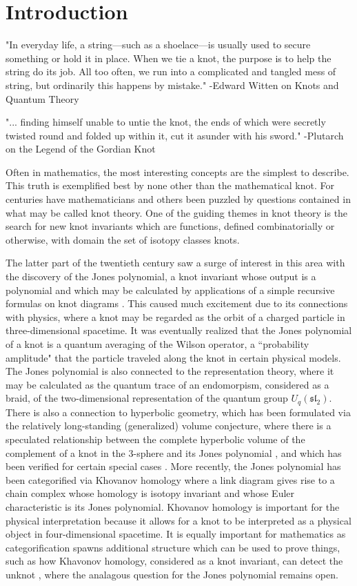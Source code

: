 \chapter{Introduction}

"In everyday life, a string—such as a shoelace—is usually used to secure something or hold it in place. When we tie a knot, the purpose is to help the string do its job. All too often, we run into a complicated and tangled mess of string, but ordinarily this happens by mistake." -Edward Witten on Knots and Quantum Theory

"... finding himself unable to untie the knot, the ends of which were secretly twisted round and folded up within it, cut it asunder with his sword." -Plutarch on the Legend of the Gordian Knot


Often in mathematics, the most interesting concepts are the simplest to describe. This truth is exemplified best by none other than the mathematical knot. For centuries have mathematicians and others been puzzled by questions contained in what may be called knot theory. One of the guiding themes in knot theory is the search for new knot invariants which are functions, defined combinatorially or otherwise, with domain the set of isotopy classes knots. 

The latter part of the twentieth century saw a surge of interest in this area with the discovery of the Jones polynomial, a knot invariant whose output is a polynomial \cite{Jon85} and which may be calculated by applications of a simple recursive formulas on knot diagrams \cite{Kau87}. This caused much excitement due to its connections with physics, where a knot may be regarded as the orbit of a charged particle in three-dimensional spacetime. It was eventually realized that the Jones polynomial of a knot is a quantum averaging of the Wilson operator, a ``probability amplitude" that the particle traveled along the knot \cite{Wit89} in certain physical models. The Jones polynomial is also connected to the representation theory, where it may be calculated as the quantum trace of an endomorpism, considered as a braid, of the two-dimensional representation of the quantum group $U_q(\mathfrak{sl}_2)$. There is also a connection to hyperbolic geometry, which has been formulated via the relatively long-standing (generalized) volume conjecture, where there is a speculated relationship between the complete hyperbolic volume of the complement of a knot in the $3$-sphere and its Jones polynomial \cite{Hik07}, and which has been verified for certain special cases \cite{KT00}. More recently, the Jones polynomial has been categorified via Khovanov homology \cite{Kho00} where a link diagram gives rise to a chain complex whose homology is isotopy invariant and whose Euler characteristic is its Jones polynomial. Khovanov homology is important for the physical interpretation because it allows for a knot to be interpreted as a physical object in four-dimensional spacetime. It is equally important for mathematics as categorification spawns additional structure which can be used to prove things, such as how Khavonov homology, considered as a knot invariant, can detect the unknot \cite{KM11}, where the analagous question for the Jones polynomial remains open.

